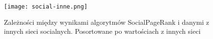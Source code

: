 \begin{figure}[htbp]
    \centering
    \texttt{[image: social-inne.png]}
    \caption{Zależności między wynikami algorytmów SocialPageRank i danymi z innych sieci socialnych. Posortowane po wartościach z innych sieci}
    \label{fig:social-inne}

\end{figure}
















